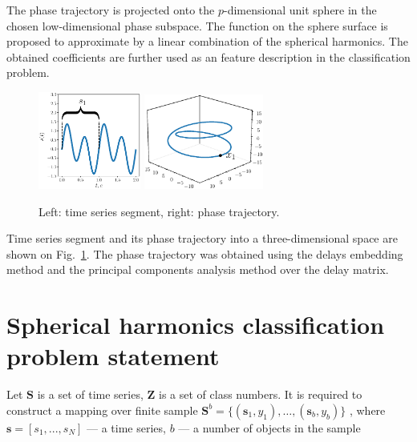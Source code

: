 \documentclass[12pt,twoside]{article}
\begin{document}
The phase trajectory is projected onto the $p$-dimensional unit sphere in the chosen low-dimensional phase subspace.
The function on the sphere surface is proposed to approximate by a linear combination of the spherical harmonics.
The obtained coefficients are further used as an feature description in the classification problem.


\begin{otherlanguage}{english}
\begin{figure}[H]
\centering
  {\includegraphics[width=0.3\textwidth]{figs/synthetic_example.eps}}
  {\includegraphics[width=0.35\textwidth]{figs/synthetic_trajectory.eps}}\\
\caption{Left: time series segment, right: phase trajectory.}
\label{fg:initial_traj}
\end{figure}
\end{otherlanguage}

Time series segment and its phase trajectory into a three-dimensional space are shown on Fig.~\ref{fg:initial_traj}.
The phase trajectory was obtained using the delays embedding method  and the principal components analysis method over the delay matrix.

\section{Spherical harmonics classification problem statement}

Let $\mathbf{S}$ is a set of time series, $\mathbf{Z}$ is a set of class numbers.
It is required to construct a mapping over finite sample $\mathbf{S}^{b} = \{(\mathbf{s}_1, y_1),\dots,(\mathbf{s}_{b}, y_{b}) \}$ , where $\mathbf{s}=[s_1,...,s_N]$ --- a time series, $b$ ---   a number of objects in the sample
\end{document}
